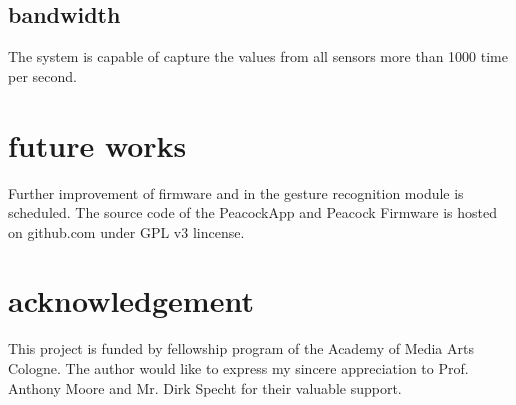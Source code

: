 \documentclass{nime-alternate}
\begin{document}
\subsection{bandwidth}
The system is capable of capture the values from all sensors more than 1000 time per second.



\section{future works}

Further improvement of firmware and in the gesture recognition module is scheduled.
The source code of the PeacockApp and Peacock Firmware is hosted on github.com under GPL v3 lincense.


\section{acknowledgement}
This project is funded by fellowship program of the Academy of Media Arts Cologne. The author would like to express my sincere appreciation to Prof. Anthony Moore and Mr. Dirk Specht for their valuable support.



\end{document}

